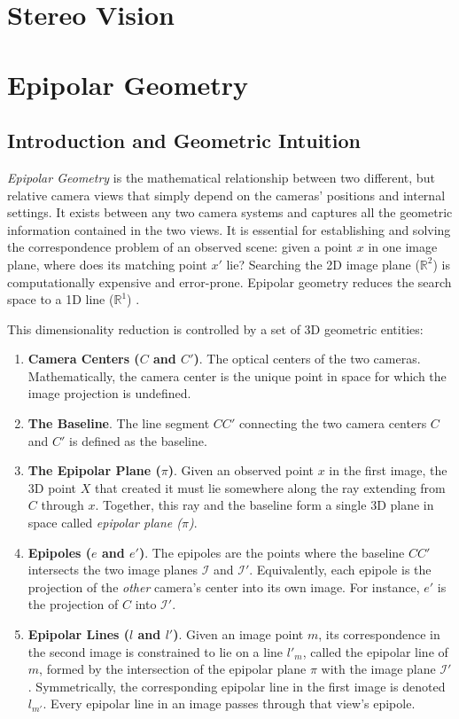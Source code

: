 \section{Stereo Vision}
\label{sec:stereo-vision}

\section{Epipolar Geometry}
\label{sec:epipolar-geometry}

\subsection{Introduction and Geometric Intuition}
\emph{Epipolar Geometry} is the mathematical relationship between two 
different, but relative camera views that simply depend on the cameras’ positions 
and internal settings. It exists between any two camera systems and captures all the geometric information contained 
in the two views. It is essential for establishing and solving the correspondence 
problem of an observed scene: given a point $x$ in one image plane, where does its matching point $x'$ lie? Searching 
the 2D image plane ($\mathbb{R}^2$) is computationally expensive and error-prone. Epipolar geometry reduces the 
search space to a 1D line ($\mathbb{R}^1$) \cite{hartley_multiple_2003,zhang_determining_1998}.

This dimensionality reduction is controlled by a set of 3D geometric entities:

\begin{enumerate}
    \item \textbf{Camera Centers ($C$ and $C'$)}. The optical centers of the two cameras. Mathematically, the camera center is the unique point in space for which the image projection is undefined.
    \item \textbf{The Baseline}. The line segment $CC'$ connecting the two camera centers $C$ and $C'$ is defined as the baseline.
    \item \textbf{The Epipolar Plane ($\pi$)}. Given an observed point $x$ in the first image, the 3D point $X$ that created it must lie somewhere along the ray extending from $C$ through $x$. Together, this ray and the baseline form a single 3D plane in space called \emph{epipolar plane ($\pi$)}.
    \item \textbf{Epipoles ($e$ and $e'$)}. The epipoles are the points where the baseline $CC'$ intersects the two image planes $\mathcal{I}$ and $\mathcal{I}'$. Equivalently, each epipole is the projection of the \emph{other} camera's center into its own image. For instance, $e'$ is the projection of $C$ into $\mathcal{I}'$.
    \item \textbf{Epipolar Lines ($l$ and $l'$)}. Given an image point $m$, its correspondence in the second image is constrained to lie on a line $l'_m$, called the epipolar line of $m$, formed by the intersection of the epipolar plane $\pi$ with the image plane $\mathcal{I}'$. Symmetrically, the corresponding epipolar line in the first image is denoted $l_{m'}$. Every epipolar line in an image passes through that view's epipole.
\end{enumerate}

